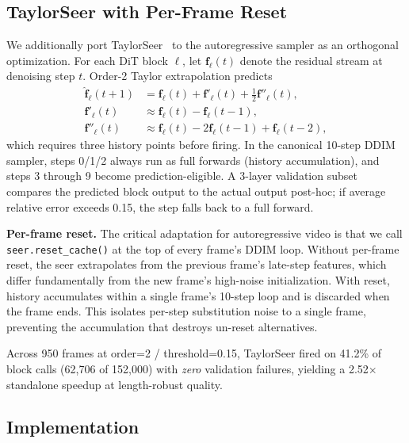 \documentclass[10pt,letterpaper,twocolumn]{article}
\begin{document}
\subsection{TaylorSeer with Per-Frame Reset}
\label{sec:taylor}

We additionally port TaylorSeer~\citep{zhang2025taylorseer} to the autoregressive sampler as an orthogonal optimization. For each DiT block $\ell$, let $\mathbf{f}_\ell(t)$ denote the residual stream at denoising step $t$. Order-2 Taylor extrapolation predicts
\begin{align}
\hat{\mathbf{f}}_\ell(t+1) &= \mathbf{f}_\ell(t) + \mathbf{f}'_\ell(t) + \tfrac{1}{2}\mathbf{f}''_\ell(t),\\
\mathbf{f}'_\ell(t)        &\approx \mathbf{f}_\ell(t) - \mathbf{f}_\ell(t-1),\\
\mathbf{f}''_\ell(t)       &\approx \mathbf{f}_\ell(t) - 2\mathbf{f}_\ell(t-1) + \mathbf{f}_\ell(t-2),
\end{align}
which requires three history points before firing. In the canonical 10-step DDIM sampler, steps 0/1/2 always run as full forwards (history accumulation), and steps 3 through 9 become prediction-eligible. A 3-layer validation subset compares the predicted block output to the actual output post-hoc; if average relative error exceeds 0.15, the step falls back to a full forward.

\textbf{Per-frame reset.} The critical adaptation for autoregressive video is that we call \texttt{seer.reset\_cache()} at the top of every frame's DDIM loop. Without per-frame reset, the seer extrapolates from the previous frame's late-step features, which differ fundamentally from the new frame's high-noise initialization. With reset, history accumulates within a single frame's 10-step loop and is discarded when the frame ends. This isolates per-step substitution noise to a single frame, preventing the accumulation that destroys un-reset alternatives.

Across 950 frames at order=2 / threshold=0.15, TaylorSeer fired on 41.2\% of block calls (62{,}706 of 152{,}000) with \emph{zero} validation failures, yielding a 2.52$\times$ standalone speedup at length-robust quality.

\subsection{Implementation}
\end{document}
